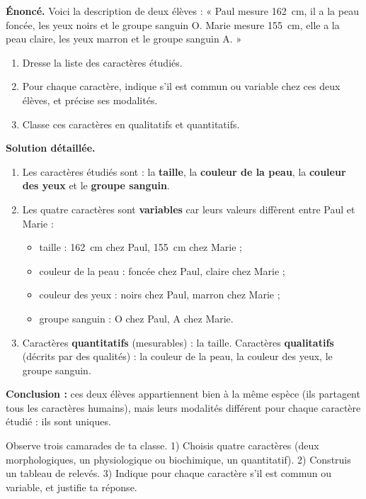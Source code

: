 \documentclass[11pt]{article}
\begin{document}
\begin{exoresolu}
\textbf{Énoncé.} Voici la description de deux élèves : « Paul mesure \SI{162}{cm}, il a la peau foncée, les yeux noirs et le groupe sanguin O. Marie mesure \SI{155}{cm}, elle a la peau claire, les yeux marron et le groupe sanguin A. »
\begin{enumerate}
\item Dresse la liste des caractères étudiés.
\item Pour chaque caractère, indique s'il est commun ou variable chez ces deux élèves, et précise ses modalités.
\item Classe ces caractères en qualitatifs et quantitatifs.
\end{enumerate}
\tcblower
\textbf{Solution détaillée.}
\begin{enumerate}
\item Les caractères étudiés sont : la \textbf{taille}, la \textbf{couleur de la peau}, la \textbf{couleur des yeux} et le \textbf{groupe sanguin}.
\item Les quatre caractères sont \textbf{variables} car leurs valeurs diffèrent entre Paul et Marie :
\begin{itemize}
\item taille : \SI{162}{cm} chez Paul, \SI{155}{cm} chez Marie ;
\item couleur de la peau : foncée chez Paul, claire chez Marie ;
\item couleur des yeux : noirs chez Paul, marron chez Marie ;
\item groupe sanguin : O chez Paul, A chez Marie.
\end{itemize}
\item Caractères \textbf{quantitatifs} (mesurables) : la taille. Caractères \textbf{qualitatifs} (décrits par des qualités) : la couleur de la peau, la couleur des yeux, le groupe sanguin.
\end{enumerate}
\textbf{Conclusion :} ces deux élèves appartiennent bien à la même espèce (ils partagent tous les caractères humains), mais leurs modalités différent pour chaque caractère étudié : ils sont uniques.
\end{exoresolu}

\begin{exercice}
Observe trois camarades de ta classe. 1) Choisis quatre caractères (deux morphologiques, un physiologique ou biochimique, un quantitatif). 2) Construis un tableau de relevés. 3) Indique pour chaque caractère s'il est commun ou variable, et justifie ta réponse.
\end{exercice}
\end{document}
